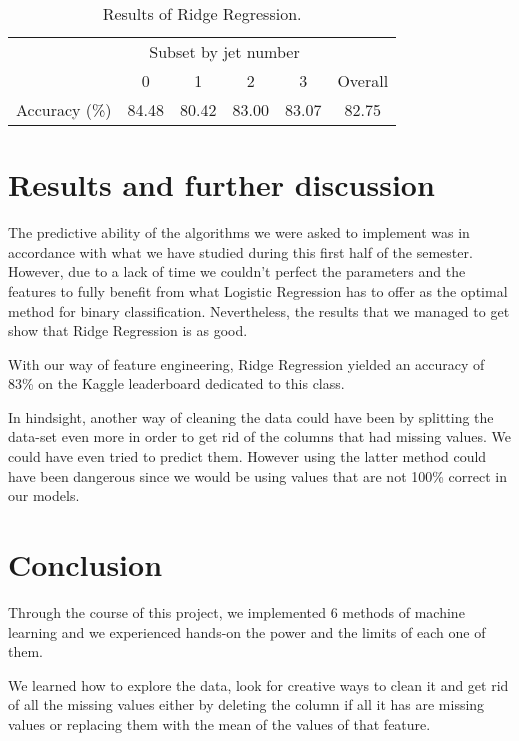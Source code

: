 \documentclass[10pt,conference,compsocconf]{IEEEtran}
\begin{document}
\begin{table}[h!]
    \centering
    \begin{tabular}{c|c|c|c|c|c}
\cline{2-5}
\multicolumn{1}{l|}{}          & \multicolumn{4}{c|}{Subset by jet number} & \multicolumn{1}{l}{}         \\ \cline{2-6} 
                               & 0        & 1        & 2        & 3        & \multicolumn{1}{c|}{Overall} \\ \hline
\multicolumn{1}{|c|}{Accuracy (\%)} & 84.48    & 80.42    & 83.00    & 83.07    & \multicolumn{1}{c|}{82.75}   \\ \hline
\end{tabular}
    \caption{Results of Ridge Regression.}
    \label{tab:results_ridge}
\end{table}
\vspace{-0.7cm}
\section{Results and further discussion}

The predictive ability of the algorithms we were asked to implement was in accordance with what we have studied during this first half of the semester. However, due to a lack of time we couldn't perfect the parameters and the features to fully benefit from what Logistic Regression has to offer as the optimal method for binary classification. Nevertheless, the results that we managed to get show that Ridge Regression is as good.

With our way of feature engineering, Ridge Regression yielded an accuracy of 83\% on the Kaggle leaderboard dedicated to this class.

In hindsight, another way of cleaning the data could have been by splitting the data-set even more in order to get rid of the columns that had missing values. We could have even tried to predict them. However using the latter method could have been dangerous since we would be using values that are not 100\% correct in our models.

\section{Conclusion}
Through the course of this project, we implemented 6 methods of machine learning and we experienced hands-on the power and the limits of each one of them.

We learned how to explore the data, look for creative ways to clean it and get rid of all the missing values either by deleting the column if all it has are missing values or replacing them with the mean of the values of that feature.



\end{document}
